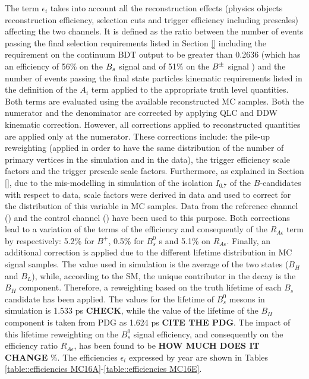 \noindent
The term $\epsilon_i$ takes into account all the reconstruction effects (physics objects reconstruction efficiency, selection cuts and  trigger efficiency including prescales) affecting the two channels. 
It is defined as the ratio between the number of events passing the final selection requirements listed in Section \ref{} including the requirement on the continuum BDT output to be greater than 0.2636 (which has an efficiency of 56\% on the $B_s$ signal and of 51\% on the $B^\pm$ signal ) and the number of events passing the final state particles kinematic requirements listed in the definition of the $A_i$ term applied to the appropriate truth level quantities. 
Both terms are evaluated using the available reconstructed MC samples. Both the numerator and the denominator are corrected by applying QLC and DDW kinematic correction. 
However, all corrections applied to reconstructed quantities are applied only at the numerator. 
These corrections include: the pile-up reweighting (applied in order to have the same distribution of the number of primary vertices in the simulation and in the data), the trigger efficiency scale factors and the trigger prescale scale factors. 
Furthermore, as explained in Section \ref{}, due to the mis-modelling in simulation of the isolation $I_{0.7}$ of the $B$-candidates with respect to data, scale factors were derived in data and used to correct for the distribution of this variable in MC samples. 
Data from the reference channel (\BpKpJpsi) and the control channel (\BsJpsiPhi) have been used to this purpose.
Both corrections lead to a variation of the terms of the efficiency and consequently of the $R_{A\epsilon}$ term by respectively: 5.2\% for $B^+$, 0.5\% for $B^0_s$ s and 5.1\% on $R_{A\epsilon}$.
Finally, an additional correction is applied due to the different lifetime distribution in MC \Bsmumu signal samples. 
The value used in simulation is the average of the two states ($B_H$ and $B_L$), while, according to the SM, the unique contributor in the \Bsmumu decay is the $B_H$ component. 
Therefore, a reweighting based on the truth lifetime of each $B_s$ candidate has been applied. 
The values for the lifetime of $B^0_s$ mesons in simulation is 1.533 ps \textbf{CHECK}, while the value of the lifetime of the $B_H$ component is taken from PDG as 1.624 ps \textbf{CITE THE PDG}. 
The impact of this lifetime reweighting on the $B^0_s$ signal efficiency, and consequently on the efficiency ratio $R_{A\epsilon}$, has been found to be \textbf{HOW MUCH DOES IT CHANGE} \%. 
The efficiencies $\epsilon_i$ expressed by year are shown in Tables \ref{table::efficiencies MC16A}-\ref{table::efficiencies MC16E}.\\


